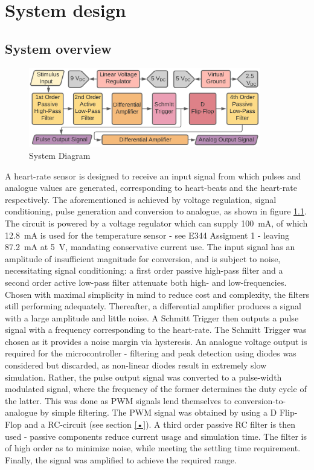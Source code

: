 
\chapter{System design}
\section{System overview} \label{sec:system}

\begin{figure}[h]
    \centering
    \vspace{-0.7cm}
    \includegraphics[width = 0.9\textwidth]{Figures/overview}
    \caption{System Diagram}
    \label{fig:overview}
\end{figure}

A heart-rate sensor is designed to receive an input signal from which pulses and analogue values are generated, corresponding to heart-beats and the heart-rate respectively. The aforementioned is achieved by voltage regulation, signal conditioning, pulse generation and conversion to analogue, as shown in figure \ref{fig:overview}. The circuit is powered by a voltage regulator \cite{ass1} which can supply \SI{100}{mA}, of which \SI{12.8}{mA} is used for the temperature sensor - see E344 Assigment 1 \cite{ass1} - leaving \SI{87.2}{mA} at \SI{5}{V}, mandating conservative current use. The input signal has an amplitude of insufficient magnitude for conversion, and is subject to noise, necessitating signal conditioning: a first order passive high-pass filter and a second order active low-pass filter attenuate both high- and low-frequencies. Chosen with maximal simplicity in mind to reduce cost and complexity, the filters still performing adequately. Thereafter, a differential amplifier produces a signal with a large amplitude and little noise. A Schmitt Trigger then outputs a pulse signal with a frequency corresponding to the heart-rate. The Schmitt Trigger was chosen as it provides a noise margin via hysteresis. An analogue voltage output is required for the microcontroller - filtering and peak detection using diodes was considered but discarded, as non-linear diodes result in extremely slow simulation. Rather, the pulse output signal was converted to a pulse-width modulated signal, where the frequency of the former determines the duty cycle of the latter. This was done as PWM signals lend themselves to conversion-to-analogue by simple filtering. The PWM signal was obtained by using a D Flip-Flop and a RC-circuit (see section \ref{•}). A third order passive RC filter is then used - passive components reduce current usage and simulation time. The filter is of high order as to minimize noise, while meeting the settling time requirement. Finally, the signal was amplified to achieve the required range.
